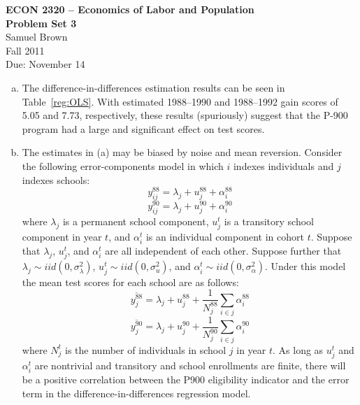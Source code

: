 \documentclass{article}
\begin{document}
\begin{center}
\textbf{ECON 2320 -- Economics of Labor and Population} \\
\textbf{Problem Set 3} \\
Samuel Brown \\
Fall 2011 \\
Due: November 14

\end{center}
\bigskip

\arraycolsep 1pt

\begin{enumerate}[(a)]

\item The difference-in-differences estimation results can be seen in Table~\ref{reg:OLS}. With estimated 1988--1990 and 1988--1992 gain scores of 5.05 and 7.73, respectively, these results (spuriously) suggest that the P-900 program had a large and significant effect on test scores.



\item The estimates in (a) may be biased by noise and mean reversion. Consider the following error-components model in which $i$ indexes individuals and $j$ indexes schools:
\begin{equation}
y_{ij}^{88} = \lambda_{j} + u_{j}^{88} + \alpha_{i}^{88}
\end{equation}
\begin{equation}
y_{ij}^{90} = \lambda_{j} + u_{j}^{90} + \alpha_{i}^{90}
\end{equation}
where $\lambda_{j}$ is a permanent school component, $u_{j}^{t}$ is a transitory school component in year $t$, and $\alpha_{i}^{t}$ is an individual component in cohort $t$. Suppose that  $\lambda_{j}$, $u_{j}^{t}$, and $\alpha_{i}^{t}$ are all independent of each other. Suppose further that $\lambda_{j} \sim iid(0,\sigma_{\lambda}^{2})$, $u_{j}^{t} \sim iid(0,\sigma_{u}^{2})$, and $\alpha_{i}^{t} \sim iid(0,\sigma_{\alpha}^{2})$. Under this model the mean test scores for each school are as follows:
\begin{equation}
\overline{y_{j}^{88}} = \lambda_{j} + u_{j}^{88} + \frac{1}{N_{j}^{88}}\sum_{i \in j}{\alpha_{i}^{88}}
\end{equation}
\begin{equation}
\overline{y_{j}^{90}} = \lambda_{j} + u_{j}^{90} + \frac{1}{N_{j}^{90}}\sum_{i \in j}{\alpha_{i}^{90}}
\end{equation}
where $N_{j}^{t}$ is the number of individuals in school $j$ in year $t$. As long as  $u_{j}^{t}$ and $\alpha_{i}^{t}$ are nontrivial and transitory and school enrollments are finite, there will be a positive correlation between the P900 eligibility indicator and the error term in the difference-in-differences regression model.


\end{enumerate}
\end{document}
